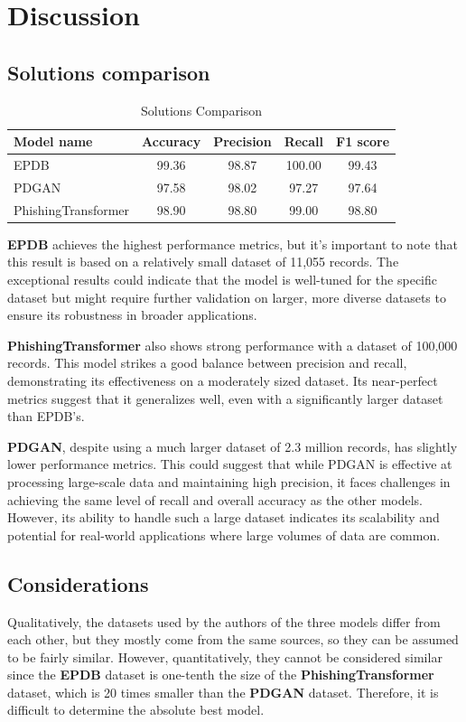 \chapter{Discussion}
\section{Solutions comparison}

\begin{table}[h]
    \centering
    \begin{tabular}{lcccc}
        \toprule
        \textbf{Model name} & \textbf{Accuracy} & \textbf{Precision} & \textbf{Recall} & \textbf{F1 score} \\ 
        \midrule
        EPDB & 99.36 & 98.87 & 100.00 & 99.43 \\
        PDGAN & 97.58 & 98.02 & 97.27 & 97.64 \\
        PhishingTransformer & 98.90 & 98.80 & 99.00 & 98.80 \\
        \bottomrule
    \end{tabular}
    \caption{Solutions Comparison}
    \label{tab:solutions_comparison}
\end{table}

\textbf{EPDB} achieves the highest performance metrics, but it's important to note that this result is based on a relatively small dataset of 11,055 records. The exceptional results could indicate that the model is well-tuned for the specific dataset but might require further validation on larger, more diverse datasets to ensure its robustness in broader applications.

\textbf{PhishingTransformer} also shows strong performance with a dataset of 100,000 records. This model strikes a good balance between precision and recall, demonstrating its effectiveness on a moderately sized dataset. Its near-perfect metrics suggest that it generalizes well, even with a significantly larger dataset than EPDB's.

\textbf{PDGAN}, despite using a much larger dataset of 2.3 million records, has slightly lower performance metrics. This could suggest that while PDGAN is effective at processing large-scale data and maintaining high precision, it faces challenges in achieving the same level of recall and overall accuracy as the other models. However, its ability to handle such a large dataset indicates its scalability and potential for real-world applications where large volumes of data are common.

\section{Considerations}
Qualitatively, the datasets used by the authors of the three models differ from each other, but they mostly come from the same sources, so they can be assumed to be fairly similar. However, quantitatively, they cannot be considered similar since the \textbf{EPDB} dataset is one-tenth the size of the \textbf{PhishingTransformer} dataset, which is 20 times smaller than the \textbf{PDGAN} dataset. Therefore, it is difficult to determine the absolute best model.

